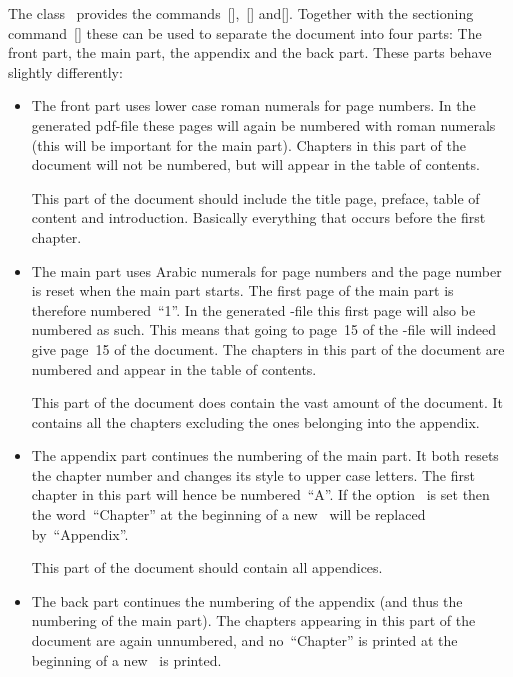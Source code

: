 The class~ provides the commands~[\comname],~[\comname] and[\comname].
Together with the sectioning command~[\comname] these can be used to separate the document into four parts:
The front part, the main part, the appendix and the back part.
These parts behave slightly differently:
\begin{itemize}
  \item
    The front part uses lower case roman numerals for page numbers.
    In the generated \pagename{pdf}-file these pages will again be numbered with roman numerals (this will be important for the main part).
    Chapters in this part of the document will not be numbered, but will appear in the table of contents.
    
    This part of the document should include the title page, preface, table of content and introduction.
    Basically everything that occurs before the first chapter.
  \item
    The main part uses Arabic numerals for page numbers and the page number is reset when the main part starts.
    The first page of the main part is therefore numbered~\enquote{1}.
    In the generated -file this first page will also be numbered as such.
    This means that going to page~15 of the -file will indeed give page~15 of the document.
    The chapters in this part of the document are numbered and appear in the table of contents.
    
    This part of the document does contain the vast amount of the document.
    It contains all the chapters excluding the ones belonging into the appendix.
  \item
    The appendix part continues the numbering of the main part.
    It both resets the chapter number and changes its style to upper case letters.
    The first chapter in this part will hence be numbered~\enquote{A}.
    If the option~ is set then the word~\enquote{Chapter} at the beginning of a new~ will be replaced by~\enquote{Appendix}.
    
    This part of the document should contain all appendices.
  \item
    The back part continues the numbering of the appendix (and thus the numbering of the main part).
    The chapters appearing in this part of the document are again unnumbered, and no~\enquote{Chapter} is printed at the beginning of a new~ is printed.
    

\end{itemize}
